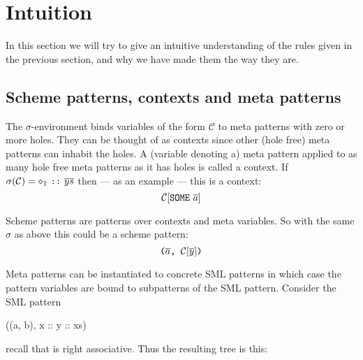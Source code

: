 \section{Intuition}
In this section we will try to give an intuitive understanding of the rules
given in the previous section, and why we have made them the way they are.

\subsection{Scheme patterns, contexts and meta patterns}
The $\sigma$-environment binds variables of the form $\mathcal{C}$ to meta
patterns with zero or more holes. They can be thought of as contexts since other
(hole free) meta patterns can inhabit the holes. A (variable denoting a) meta
pattern applied to as many hole free meta patterns as it has holes is called a
context. If $\sigma(\mathcal{C}) = \diamond_1\ \ttt{::}\ \ol{ys}$ then --- as an
example --- this is a context:
\[
\mathcal{C}[\texttt{SOME}\ \overline{a}]
\]

Scheme patterns are patterns over contexts and meta variables. So with the same
$\sigma$ as above this could be a scheme pattern:
\[
\texttt{($\overline{a}$, $\mathcal{C}[\overline{y}]$)}
\]

Meta patterns can be instantiated to concrete SML patterns in which case the
pattern variables are bound to subpatterns of the SML pattern. Consider the SML
pattern
\begin{sml}
((a, b), x :: y :: xs)
\end{sml}
recall that \ttt{::} is right associative. Thus the resulting tree is this:
\begin{center}
\end{center}

